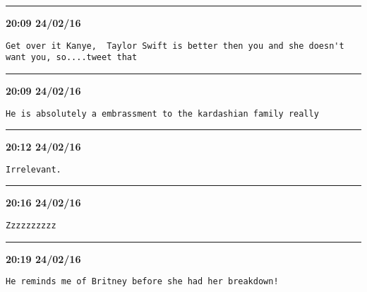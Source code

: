 \hrule%

\begin{adjustwidth}{0cm}{0cm}
\footnotesize \textbf{20:09 24/02/16}

\begin{lstlisting}[breaklines, breakatwhitespace, basicstyle=\small, frame=leftline]
Get over it Kanye,  Taylor Swift is better then you and she doesn't want you, so....tweet that
\end{lstlisting}
\end{adjustwidth}

\hrule%

\begin{adjustwidth}{0cm}{0cm}
\footnotesize \textbf{20:09 24/02/16}

\begin{lstlisting}[breaklines, breakatwhitespace, basicstyle=\small, frame=leftline]
He is absolutely a embrassment to the kardashian family really
\end{lstlisting}
\end{adjustwidth}

\hrule%

\begin{adjustwidth}{0cm}{0cm}
\footnotesize \textbf{20:12 24/02/16}

\begin{lstlisting}[breaklines, breakatwhitespace, basicstyle=\small, frame=leftline]
Irrelevant.
\end{lstlisting}
\end{adjustwidth}

\hrule%

\begin{adjustwidth}{0cm}{0cm}
\footnotesize \textbf{20:16 24/02/16}

\begin{lstlisting}[breaklines, breakatwhitespace, basicstyle=\small, frame=leftline]
Zzzzzzzzzz
\end{lstlisting}
\end{adjustwidth}

\hrule%

\begin{adjustwidth}{0cm}{0cm}
\footnotesize \textbf{20:19 24/02/16}

\begin{lstlisting}[breaklines, breakatwhitespace, basicstyle=\small, frame=leftline]
He reminds me of Britney before she had her breakdown!
\end{lstlisting}
\end{adjustwidth}

